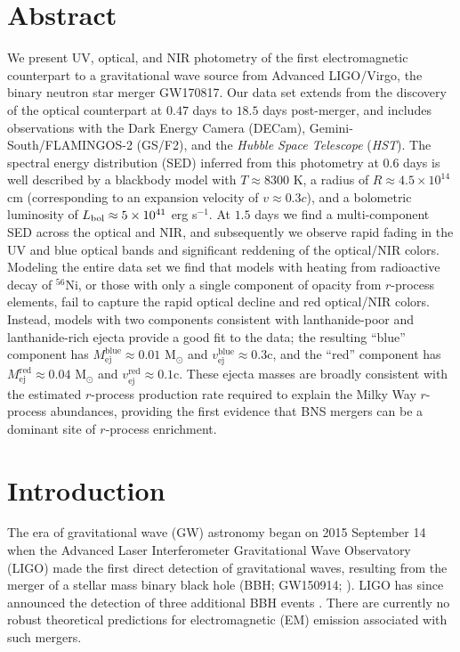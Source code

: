 
\section*{Abstract}
We present UV, optical, and NIR photometry of the first electromagnetic counterpart to a gravitational wave source from Advanced LIGO/Virgo, the binary neutron star merger GW170817. Our data set extends from the discovery of the optical counterpart at $0.47$ days to $18.5$ days post-merger, and includes observations with the Dark Energy Camera (DECam), Gemini-South/FLAMINGOS-2 (GS/F2), and the {\it Hubble Space Telescope} ({\it HST}). The spectral energy distribution (SED) inferred from this photometry at $0.6$ days is well described by a blackbody model with $T\approx 8300$ K, a radius of $R\approx 4.5\times 10^{14}$ cm (corresponding to an expansion velocity of $v\approx 0.3c$), and a bolometric luminosity of $L_{\rm bol}\approx 5\times10^{41}$ erg s$^{-1}$. At $1.5$ days we find a multi-component SED across the optical and NIR, and subsequently we observe rapid fading in the UV and blue optical bands and significant reddening of the optical/NIR colors. Modeling the entire data set we find that models with heating from radioactive decay of $^{56}$Ni, or those with only a single component of opacity from $r$-process elements, fail to capture the rapid optical decline and red optical/NIR colors. Instead, models with two components consistent with lanthanide-poor and lanthanide-rich ejecta provide a good fit to the data; the resulting ``blue'' component has $M_\mathrm{ej}^\mathrm{blue}\approx 0.01$ M$_\odot$ and $v_\mathrm{ej}^\mathrm{blue}\approx 0.3$c, and the ``red'' component has $M_\mathrm{ej}^\mathrm{red}\approx 0.04$ M$_\odot$ and $v_\mathrm{ej}^\mathrm{red}\approx 0.1$c. These ejecta masses are broadly consistent with the estimated $r$-process production rate required to explain the Milky Way $r$-process abundances, providing the first evidence that BNS mergers can be a dominant site of $r$-process enrichment.

\section{Introduction}
\label{sec:ch5_intro}
The era of gravitational wave (GW) astronomy began on 2015 September 14 when the Advanced Laser Interferometer Gravitational Wave Observatory (LIGO) made the first direct detection of gravitational waves, resulting from the merger of a stellar mass binary black hole (BBH; GW150914; \citealt{LIGOGW150914}). LIGO has since announced the detection of three additional BBH events \citep{LIGOGW151226,LIGOGW170104,LIGOGW170814}.  There are currently no robust theoretical predictions for electromagnetic (EM) emission associated with such mergers.

